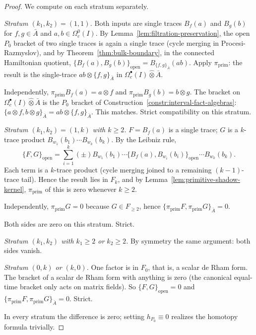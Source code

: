 \begin{proof}
  We compute on each stratum separately.

  \emph{Stratum $(k_1,k_2)=(1,1)$.}  Both inputs are single traces
  $B_f(a)$ and $B_g(b)$ for $f,g\in\bar A$ and
  $a,b\in\Omega^0_c(I)$.  By
  Lemma~\ref{lem:filtration-preservation}, the open
  $P_0$ bracket of two single traces is again a single trace
  (cycle merging in Procesi-Razmyslov), and by
  Theorem~\ref{thm:bulk-boundary}, in the connected Hamiltonian
  quotient,
  $\{B_f(a),B_g(b)\}_{\mathrm{open}}=B_{\{f,g\}_{\bar A}}(ab)$.
  Apply $\pi_{\mathrm{prim}}$: the result is the single-trace
  $ab\otimes\{f,g\}_{\bar A}$ in
  $\Omega^\bullet_c(I)\widehat\otimes\bar A$.

  Independently, $\pi_{\mathrm{prim}}B_f(a)=a\otimes f$ and
  $\pi_{\mathrm{prim}}B_g(b)=b\otimes g$.  The bracket on
  $\Omega^\bullet_c(I)\widehat\otimes\bar A$ is the
  $P_0$ bracket of Construction~\ref{constr:interval-fact-algebras}:
  $\{a\otimes f,b\otimes g\}_{\bar A}=ab\otimes\{f,g\}_{\bar A}$.
  This matches.  Strict compatibility on this stratum.

  \emph{Stratum $(k_1,k_2)=(1,k)$ with $k\geq 2$.}  $F=B_f(a)$ is a
  single trace; $G$ is a $k$-trace product
  $B_{w_1}(b_1)\cdots B_{w_k}(b_k)$.  By the Leibniz rule,
  $$\{F,G\}_{\mathrm{open}}=\sum_{i=1}^k(\pm)
    B_{w_1}(b_1)\cdots
    \{B_f(a),B_{w_i}(b_i)\}_{\mathrm{open}}\cdots
    B_{w_k}(b_k).$$
  Each term is a $k$-trace product (cycle merging joined to a
  remaining $(k-1)$-trace tail).  Hence the result lies in $F_k$,
  and by Lemma~\ref{lem:primitive-shadow-kernel}, $\pi_{\mathrm{prim}}$ of
  this is zero whenever $k\geq 2$.

  Independently, $\pi_{\mathrm{prim}}G=0$ because $G\in F_{\geq 2}$,
  hence $\{\pi_{\mathrm{prim}}F,\pi_{\mathrm{prim}}G\}_{\bar A}=0$.

  Both sides are zero on this stratum.  Strict.

  \emph{Stratum $(k_1,k_2)$ with $k_1\geq 2$ or $k_2\geq 2$.}  By
  symmetry the same argument: both sides vanish.

  \emph{Stratum $(0,k)$ or $(k,0)$.}  One factor is in
  $F_0$, that is, a scalar de Rham form.  The bracket of a scalar
  de Rham form with anything is zero (the canonical equal-time
  bracket only acts on matrix fields).  So
  $\{F,G\}_{\mathrm{open}}=0$ and
  $\{\pi_{\mathrm{prim}}F,\pi_{\mathrm{prim}}G\}_{\bar A}=0$.  Strict.

  In every stratum the difference is zero; setting $h_{P_0}\equiv 0$
  realizes the homotopy formula trivially.
\end{proof}

